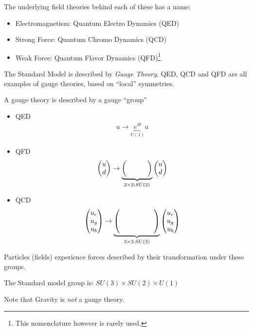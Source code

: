 The underlying field theories behind each of these has a name:
\begin{itemize}
\item Electromagnetism: Quantum Electro Dynamics (QED)
\item Strong Force: Quantum Chromo Dynamics (QCD)
\item Weak Force: Quantum Flavor Dynamics (QFD)\footnote{This nomenclature however is rarely used.}
\end{itemize}
The Standard Model is described by \emph{Gauge Theory}, QED, QCD and QFD are all examples of gauge theories, based on ``local'' symmetries.

A gauge theory is described by a gauge ``group''
\begin{itemize}
\item QED
  \begin{align*}
    u\to \underbrace{e^{i\theta}}_{U(1)}u
  \end{align*}
  
\item QFD
  \begin{align*}
    \pmqty{u\\d}\to \underbrace{\pmqty{&&& \\ &&&}}_{2\times2:SU(2)}\pmqty{u\\d}
  \end{align*}
\item QCD
  \begin{align*}
    \pmqty{u_r\\u_g\\u_b}\to
    \underbrace{\pmqty{&&&&& \\ &&&&& \\ &&&&&}}_{3\times3:SU(3)}
    \pmqty{u_r\\u_g\\u_b}
  \end{align*}
\end{itemize}
Particles (fields) experience forces described by their transformation under these groups.

The Standard model group is: $SU(3)\times SU(2)\times U(1)$

Note that Gravity is \emph{not} a gauge theory.

